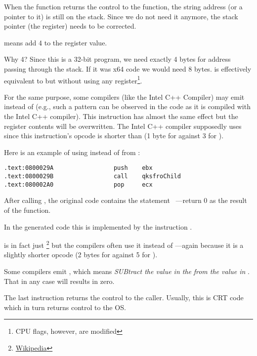 When the \printf function returns the control to the \main function, the string address (or a pointer to it) is still on the stack.
Since we do not need it anymore, the \gls{stack pointer} (the \ESP register) needs to be corrected.

 means add 4 to the \ESP register value.

Why 4? Since this is a 32-bit program, we need exactly 4 bytes for address passing through the stack. If it was x64 code we would need 8 bytes.
 is effectively equivalent to  but without using any register\footnote{CPU flags, however, are modified}.

\myindex{\oracle}

For the same purpose, some compilers (like the Intel C++ Compiler) may emit 
instead of \ADD (e.g., such a pattern can be observed in the \oracle{} code as it is compiled with the Intel C++ compiler).
This instruction has almost the same effect but the \ECX register contents will be overwritten.
The Intel C++ compiler supposedly uses  since this instruction's opcode is shorter than  (1 byte for  against 3 for ).

Here is an example of using \POP instead of \ADD from \oracle{}:

\begin{lstlisting}[caption=\oracle 10.2 Linux (app.o file),style=customasmx86]
.text:0800029A                 push    ebx
.text:0800029B                 call    qksfroChild
.text:080002A0                 pop     ecx
\end{lstlisting}

After calling \printf, the original \CCpp code contains the statement ~---return 0 as the result of the \main function.

In the generated code this is implemented by the instruction .


\XOR is in fact just \footnote{\href{http://go.yurichev.com/17118}{Wikipedia}} but the compilers often use it instead of
---again because it is a slightly shorter opcode (2 bytes for \XOR against 5 for \MOV).

Some compilers emit , which means \emph{SUBtract the value in the} \EAX \emph{from the value in} \EAX. That in any case will results in zero.

The last instruction \RET returns the control to the \gls{caller}. Usually, this is \CCpp \ac{CRT} code which in turn returns control to the \ac{OS}.
